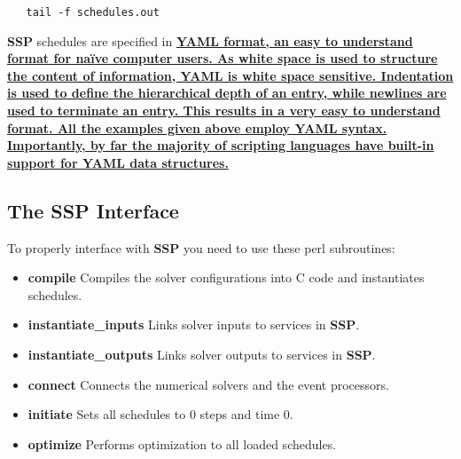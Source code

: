 \documentclass[12pt]{article}
\begin{document}
\begin{verbatim}
   tail -f schedules.out
\end{verbatim}
{\bf SSP} schedules are specified in \href{http://www.yaml.org/}\bf {YAML} format, an easy to understand format for na\"{i}ve computer users. As white space is  used to structure the content of information, YAML is white space sensitive. Indentation is used to define the hierarchical depth of an entry, while newlines are used to terminate an entry. This results in a very easy to understand format. All the examples given above employ YAML syntax. Importantly, by far the majority of scripting languages have built-in support for YAML data structures. 

\subsection*{The SSP Interface}

To properly interface with {\bf SSP} you need to use these perl subroutines:

\begin{itemize}
\item[] {\bf compile} Compiles the solver configurations into C code and instantiates schedules.
\item[] {\bf instantiate\_inputs} Links solver inputs to services in {\bf SSP}.
\item[] {\bf instantiate\_outputs} Links solver outputs to services in {\bf SSP}. 
\item[] {\bf connect} Connects the numerical solvers and the event processors.
\item[] {\bf initiate} Sets all schedules to 0 steps and time 0.
\item[] {\bf optimize} Performs optimization to all loaded schedules.
\end{itemize}
\end{document}
